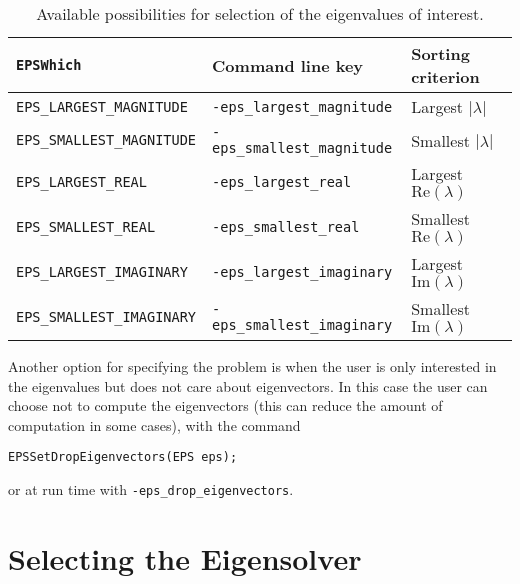 \begin{table}[t]
\centering
{\small \begin{tabular}{lll}
\texttt{EPSWhich}                  & Command line key                   & Sorting criterion \\\hline
\texttt{EPS\_LARGEST\_MAGNITUDE}   & \texttt{-eps\_largest\_magnitude}  & Largest $|\lambda|$ \\
\texttt{EPS\_SMALLEST\_MAGNITUDE}  & \texttt{-eps\_smallest\_magnitude} & Smallest $|\lambda|$ \\
\texttt{EPS\_LARGEST\_REAL}        & \texttt{-eps\_largest\_real}       & Largest $\mathrm{Re}(\lambda)$ \\
\texttt{EPS\_SMALLEST\_REAL}       & \texttt{-eps\_smallest\_real}      & Smallest $\mathrm{Re}(\lambda)$ \\
\texttt{EPS\_LARGEST\_IMAGINARY}   & \texttt{-eps\_largest\_imaginary}  & Largest $\mathrm{Im}(\lambda)$\footnotemark \\
\texttt{EPS\_SMALLEST\_IMAGINARY}  & \texttt{-eps\_smallest\_imaginary} & Smallest $\mathrm{Im}(\lambda)$\addtocounter{footnote}{-1}\footnotemark \\\hline
\end{tabular} }
\caption{\label{tab:portion}Available possibilities for selection of the eigenvalues of interest.}
\end{table}


	Another option for specifying the problem is when the user is only interested in the eigenvalues but does not care about eigenvectors. In this case the user can choose not to compute the eigenvectors (this can reduce the amount of computation in some cases), with the command
	\begin{Verbatim}[fontsize=\small]
	EPSSetDropEigenvectors(EPS eps);
	\end{Verbatim}
or at run time with \Verb!-eps_drop_eigenvectors!.

\section{Selecting the Eigensolver}

